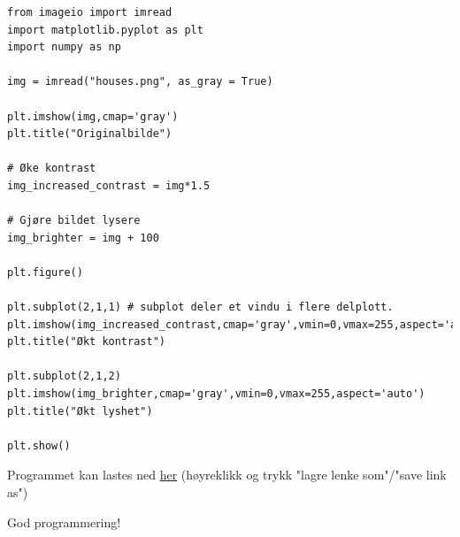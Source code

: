 \documentclass[%
oneside,                 %
final,                   %
10pt]{article}
\begin{document}
\begin{verbatim}
from imageio import imread
import matplotlib.pyplot as plt
import numpy as np

img = imread("houses.png", as_gray = True)

plt.imshow(img,cmap='gray')
plt.title("Originalbilde")

# Øke kontrast
img_increased_contrast = img*1.5

# Gjøre bildet lysere
img_brighter = img + 100

plt.figure()

plt.subplot(2,1,1) # subplot deler et vindu i flere delplott.
plt.imshow(img_increased_contrast,cmap='gray',vmin=0,vmax=255,aspect='auto')
plt.title("Økt kontrast")

plt.subplot(2,1,2)
plt.imshow(img_brighter,cmap='gray',vmin=0,vmax=255,aspect='auto')
plt.title("Økt lyshet")

plt.show()
\end{verbatim}
Programmet kan lastes ned \href{{https://github.com/krisbhei/INF2310/raw/master/Programmering/Python/demo.py}}{her} (høyreklikk og trykk "lagre lenke som"/"save link as")

God programmering!



\end{document}
